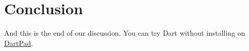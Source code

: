 \section{Conclusion}
And this is the end of our discussion. You can try Dart without installing on \href{https://dartpad.dev/}{DartPad}.